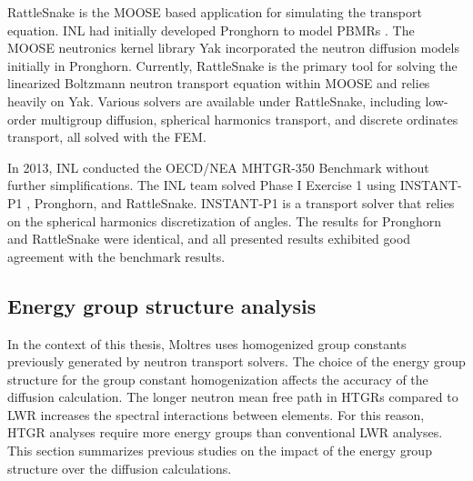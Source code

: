RattleSnake \cite{wang_rattlesnake_2019} is the MOOSE \cite{gaston_moose_2009} based application for simulating the transport equation.
\gls{INL} had initially developed Pronghorn \cite{novak_pronghorn_2018} to model \glspl{PBMR} \cite{strydom_inl_2013}.
The MOOSE neutronics kernel library Yak incorporated the neutron diffusion models initially in Pronghorn.
Currently, RattleSnake is the primary tool for solving the linearized Boltzmann neutron transport equation within MOOSE and relies heavily on Yak.
Various solvers are available under RattleSnake, including low-order multigroup diffusion, spherical harmonics transport, and discrete ordinates transport, all solved with the \gls{FEM}.

In 2013, \gls{INL} conducted the OECD/NEA MHTGR-350 Benchmark \cite{oecd_nea_benchmark_2017}\cite{strydom_inl_2013} without further simplifications.
The \gls{INL} team solved Phase I Exercise 1 using INSTANT-P1 \cite{wang_krylov_2011}, Pronghorn, and RattleSnake.
INSTANT-P1 is a transport solver that relies on the spherical harmonics discretization of angles.
The results for Pronghorn and RattleSnake were identical, and all presented results exhibited good agreement with the benchmark results.

\subsection{Energy group structure analysis}
\label{sec:energy-struct}

In the context of this thesis, Moltres uses homogenized group constants previously generated by neutron transport solvers.
The choice of the energy group structure for the group constant homogenization affects the accuracy of the diffusion calculation.
The longer neutron mean free path in \glspl{HTGR} compared to \gls{LWR} increases the spectral interactions between elements.
For this reason, HTGR analyses require more energy groups than conventional \gls{LWR} analyses.
This section summarizes previous studies on the impact of the energy group structure over the diffusion calculations.

